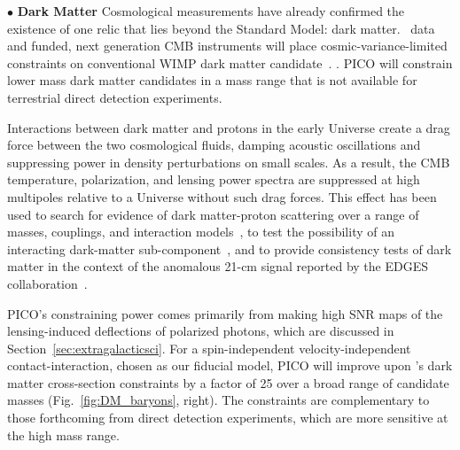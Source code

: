 \documentclass[PICOReport.tex]{subfiles}
\begin{document}

\noindent$\bullet$ {\bf Dark Matter} \hspace{0.1in} Cosmological measurements have already confirmed the existence of one relic that lies beyond the Standard Model: dark matter. \planck\ data and funded, next generation CMB instruments will place cosmic-variance-limited constraints on conventional WIMP dark matter candidate~\citep{Madhavacheril:2013cna,Green:2018pmd}. . PICO will constrain lower mass dark matter candidates in a mass range that is not available for terrestrial direct detection experiments. 

 
Interactions between dark matter and protons in the early Universe create a drag force between the two cosmological fluids, damping acoustic oscillations and suppressing power in density perturbations on small scales. As a result, the CMB temperature, polarization, and lensing power spectra are suppressed at high multipoles relative to a Universe without such drag forces.  This effect has been used to search for evidence of dark matter-proton scattering over a range of masses, couplings, and interaction models~\citep{2002astro.ph..2496C, 2004PhRvD..70h3501S, Dvorkin:2013cea, 2018PhRvL.121h1301G,2018arXiv180108609B, 2018PhRvD..97j3530X, 2018arXiv180800001B, 2018PhRvD..98b3013S}, to test the possibility of an interacting dark-matter sub-component~\citep{2018arXiv180800001B}, and to provide consistency tests of dark matter in the context of the anomalous 21-cm signal reported by the EDGES collaboration~\citep{2018Natur.555...71B,2018Natur.555...67B,2018arXiv180800001B,2018arXiv180711482K}.

PICO's constraining power comes primarily from making high \ac{SNR} maps of the lensing-induced deflections of polarized photons, which are discussed in Section~\ref{sec:extragalacticsci}.  For a spin-independent velocity-independent contact-interaction, chosen as our fiducial model, PICO will improve upon \planck 's dark matter cross-section constraints by a factor of 25 over a broad range of candidate masses (Fig.~\ref{fig:DM_baryons}, right). The constraints are complementary to those forthcoming from direct detection experiments, which are more sensitive at the high mass range.  
\end{document}

